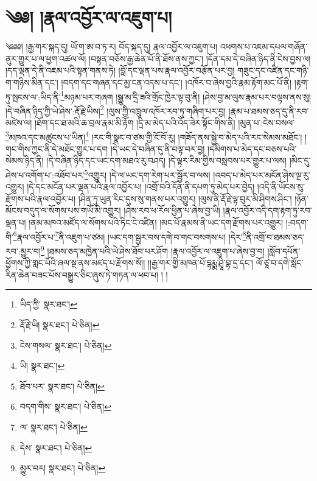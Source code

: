 \setcounter{footnote}{0} 
\chapter{༄༅། །རྣལ་འབྱོར་ལ་འཇུག་པ།}༄༅༅། །རྒྱ་གར་སྐད་དུ། ཡོ་ག་ཨ་བ་ཏ་ར། བོད་སྐད་དུ། རྣལ་འབྱོར་ལ་འཇུག་པ། འཕགས་པ་འཇམ་དཔལ་གཞོན་ནུར་གྱུར་པ་ལ་ཕྱག་འཚལ་ལོ། །བསྟན་བཅོས་རྒྱ་ཆེན་པོ་ནི་ཐོས་ནས་ཀྱང་། །དོན་དམ་དེ་བཞིན་ཉིད་ནི་ངེས་བྱས་ལ། །དད་ལྡན་དེ་ནི་འཇམ་པའི་སྟན་གནས་ཏེ། །བློ་དང་ལྡན་པས་རྣལ་འབྱོར་བརྩོན་པར་བྱ། གཟུང་དང་འཛིན་དང་གཉི་ག་གཉིས་མིན་དང་། །བདག་དང་གཞན་དང་མྱ་ངན་འདས་པ་དང་། །འཁོར་བ་ཞེས་བྱའི་རྣམ་རྟོག་མང་པོ་ནི། །རྟག་ཏུ་སྤངས་ལ་:ཡིད་ནི་\footnote{ཡིད་ཀྱི་  སྣར་ཐང་། }མཉམ་པར་གཞག །སྒྱུ་མ་དྲི་ཟའི་གྲོང་ཁྱེར་ལྟ་བུ་ནི། །ཤེས་བྱ་མ་ལུས་རྣམ་པར་བལྟས་ནས་སུ། །དེ་བཞིན་ཉིད་ཀྱི་ཡེ་ཤེས་:རྡོ་རྗེ་ཡིས།\footnote{རྡོ་རྗེ་ཡི།  སྣར་ཐང་།  པེ་ཅིན། } །ལུས་ཀྱི་འཁྲུལ་འཁོར་རབ་ཏུ་གཞིག་པར་བྱ། །རྣམ་པ་ཐམས་ཅད་དུ་ནི་རབ་མཛེས་ལ། །ཐོག་དང་ཐ་མའི་ཆ་བྲལ་རྣམ་མི་རྟོག །དྲི་མ་མེད་པའི་འོད་ཟེར་སྟོང་གིས་ནི། །མུན་པ་:ངེས་བསལ་\footnote{ངེས་གསལ་  སྣར་ཐང་།  པེ་ཅིན། }མཁའ་དང་མཚུངས་པ་ཡིན།\footnote{ཡི།  སྣར་ཐང་། } །རང་གི་སྣང་བ་ཙམ་གྱི་ངོ་བོ་རུ། །གཟོད་ནས་སྐྱེ་བ་མེད་པའི་རང་སེམས་མཐོང་། །གང་གིས་ཀྱང་ནི་དེ་མཐོང་གྱུར་པ་དག །དེ་ཡང་དེ་བཞིན་དུ་ནི་བལྟ་བར་བྱ། །དམིགས་པ་མེད་དང་བཅས་པའི་སེམས་ཉིད་ནི། །དེ་བཞིན་ཉིད་དང་ཡང་དག་མཐའ་རུ་བཤད། །དེ་ལྟར་རིམ་གྱིས་བསླབས་པར་གྱུར་པ་ལས། །མིང་དུ་ཤེས་པ་འགོག་པ་:འཐོབ་པར་\footnote{ཐོབ་པར་  སྣར་ཐང་།  པེ་ཅིན། }འགྱུར། །དེ་ལ་ཡང་དག་རེག་པར་སྦྱོར་བ་ལས། །འབད་པ་མེད་པར་མངོན་ཤེས་ལྔ་རུ་འགྱུར། །དེ་དང་མངོན་པར་ལྡན་པའི་རྣལ་འབྱོར་པ། །འགྲོ་བའི་དོན་ནི་དཔག་ཏུ་མེད་པར་བྱེད། །འདི་ནི་ཡོངས་སུ་རྫོགས་པའི་རྣལ་འབྱོར་པ། །ཤིན་ཏུ་ཡུན་རིང་དུས་སུ་གནས་པར་འགྱུར། །ལུས་ནི་རྡོ་རྗེ་ལྟ་བུར་མི་ཤིགས་ཤིང་། །ཉོན་མོངས་བདུད་ལ་སོགས་པས་གཡོ་མི་འགྱུར། །ཤེས་རབ་ཕ་རོལ་ཕྱིན་པ་ཞེས་བྱ་ཡི། །རྣལ་འབྱོར་འདི་དག་རྟག་ཏུ་རབ་ལྡན་པ། །ནམ་མཁའ་མཛོད་ལ་སོགས་པའི་ཏིང་ངེ་འཛིན། །མང་པོ་རྣམས་ནི་ཡང་དག་རྫོགས་པར་འགྱུར། །:བདག་གི་\footnote{བདག་གིས་  སྣར་ཐང་།  པེ་ཅིན། }རྣལ་འབྱོར་པ་\footnote{ལ་  སྣར་ཐང་།  པེ་ཅིན། }ནི་འཇུག་པ་ཙམ། །ཡང་དག་སྦྱར་བས་དགེ་བ་གང་བསགས་པ། །དེར་\footnote{དེས་  སྣར་ཐང་།  པེ་ཅིན། }ནི་འགྲོ་བ་ཐམས་ཅད་རབ་:མྱུར་བ།\footnote{མྱུར་བར།  སྣར་ཐང་།  པེ་ཅིན། } །ཐམས་ཅད་མཁྱེན་པའི་ཡེ་ཤེས་ཐོབ་པར་ཤོག །རྣལ་འབྱོར་ལ་འཇུག་པ་ཞེས་བྱ་བ། །སློབ་དཔོན་ཕྱོགས་ཀྱི་གླང་པོའི་ཞལ་སྔ་ནས་མཛད་པ་རྫོགས་སོ།། །།རྒྱ་གར་གྱི་མཁན་པོ་དྷརྨྨ་ཤྲཱི་བྷ་དྲ་དང་། ལོ་ཙཱ་བ་དགེ་སློང་རིན་ཆེན་བཟང་པོས་བསྒྱུར་ཅིང་ཞུས་ཏེ་གཏན་ལ་ཕབ་པ། ། །